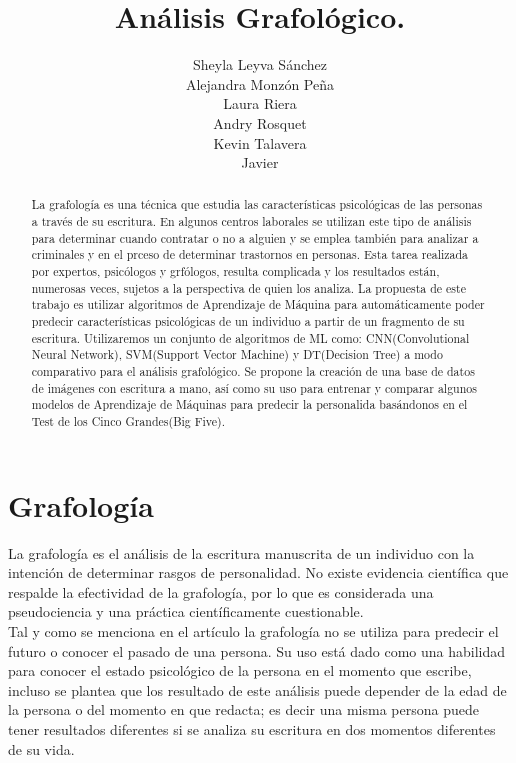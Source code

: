 \documentclass[10pt, a4paper]{article}
\begin{document}
    \title{An\'alisis Grafol\'ogico.}
    \author{Sheyla Leyva S\'anchez \\ Alejandra Monz\'on Pe\~na \\ Laura Riera \\ Andry Rosquet \\ Kevin Talavera \\ Javier}
    \date{}
    \maketitle

    \begin{abstract}
        La grafología es una técnica que estudia las características psicológicas de las personas a través de su escritura. 
        En algunos centros laborales se utilizan este tipo de análisis para determinar cuando contratar o no a alguien y se emplea también 
        para analizar a criminales y en el prceso de determinar trastornos en personas. Esta tarea realizada por expertos,
        psicólogos y grfólogos, resulta complicada y los resultados están, numerosas veces, sujetos a la perspectiva de quien los analiza. La propuesta de este trabajo es 
        utilizar algoritmos de Aprendizaje de Máquina para automáticamente poder predecir características psicológicas de un individuo a partir de un fragmento de su escritura. 
        Utilizaremos un conjunto de algoritmos de ML como: CNN(Convolutional Neural Network), SVM(Support Vector Machine) y DT(Decision Tree) a modo comparativo para el análisis grafológico. 
        Se propone la creaci\'on de una base de datos de im\'agenes con escritura a mano, as\'i como su uso para entrenar y comparar algunos modelos de Aprendizaje de M\'aquinas para predecir la personalida bas\'andonos en el Test de los Cinco Grandes(Big Five).
    \end{abstract}
    
    \section{Grafolog\'ia}
    
        La grafología es el análisis de la escritura manuscrita de un individuo con la intención de determinar rasgos de personalidad. 
        No existe evidencia científica que respalde la efectividad de la grafología, por lo que es considerada una pseudociencia 
        y una práctica científicamente cuestionable.\\ 

        Tal y como se menciona en el art\'iculo \cite{19} la grafolog\'ia no se utiliza para predecir el futuro o conocer el pasado de una persona. Su uso 
        est\'a dado como una habilidad para conocer el estado psicol\'ogico de la persona en el momento que escribe, incluso se plantea que los resultado de este an\'alisis 
        puede depender de la edad de la persona o del momento en que redacta; es decir una misma persona puede tener resultados diferentes si se analiza su escritura en dos momentos 
        diferentes de su vida.\\
\end{document}
